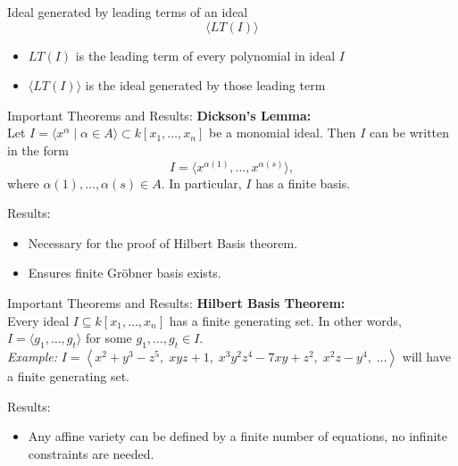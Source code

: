 \documentclass{beamer}
\begin{document}
\begin{frame}{Ideal generated by leading terms of an ideal}
    $$\langle LT(I)\rangle$$
    \begin{itemize}
    \item<1-> $LT(I)$ is the leading term of every polynomial in ideal $I$
    \item<1-> $\langle LT(I)\rangle$ is the ideal generated by those leading term
    \end{itemize}
\end{frame}

\begin{frame}{Important Theorems and Results:}
\textbf{Dickson's Lemma:} \\
 Let $I = \langle x^\alpha \mid \alpha \in A \rangle \subset k[x_1, \dots, x_n]$ be a monomial ideal. Then $I$ can be written in the form 
    \[
    I = \langle x^{\alpha(1)}, \dots, x^{\alpha(s)} \rangle,
    \]
    where $\alpha(1), \dots, \alpha(s) \in A$. In particular, $I$ has a finite basis. \\ 
    \pause
    \begin{block}{Results:}
        \begin{itemize}
        \item<1-> Necessary for the proof of Hilbert Basis theorem. 
        \item<1-> Ensures finite Gröbner basis exists. 
        
    \end{itemize}
    \end{block}   
\end{frame}

\begin{frame}{Important Theorems and Results:}
    \textbf{Hilbert Basis Theorem:} \\
    Every ideal \( I \subseteq k[x_1, \dots, x_n] \) has a finite generating set. In other words, \( I = \langle g_1, \dots, g_t \rangle \) for some \( g_1, \dots, g_t \in I \).
    \\ 
    \textit{Example:} $I = \left\langle x^2 + y^3 - z^5,\; xyz + 1,\; x^3 y^2 z^4 - 7xy + z^2,\; x^2 z - y^4,\; \dots \right\rangle$ will have a finite generating set. 
    \begin{block}{Results:}
        \begin{itemize}
            \item <1-> Any affine variety can be defined by a finite number of equations, no infinite constraints are needed. 

        \end{itemize}
    \end{block}
\end{frame}
\end{document}
